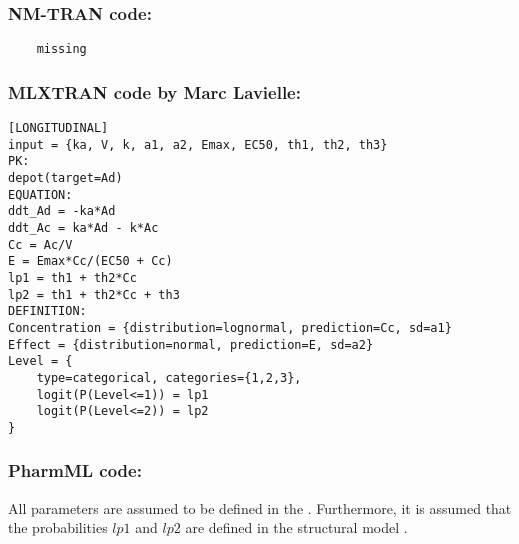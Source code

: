 \subsubsection{NM-TRAN code:}

\myStartLine

\lstset{language=NONMEMdataSet}
\begin{lstlisting}
	missing
\end{lstlisting}

\myEndLine

\subsubsection{MLXTRAN code by Marc Lavielle:}

\myStartLine

\lstset{language=MLXTRANcode}
\begin{lstlisting}
[LONGITUDINAL]
input = {ka, V, k, a1, a2, Emax, EC50, th1, th2, th3}
PK:
depot(target=Ad)
EQUATION:
ddt_Ad = -ka*Ad
ddt_Ac = ka*Ad - k*Ac
Cc = Ac/V
E = Emax*Cc/(EC50 + Cc)
lp1 = th1 + th2*Cc
lp2 = th1 + th2*Cc + th3
DEFINITION:
Concentration = {distribution=lognormal, prediction=Cc, sd=a1}
Effect = {distribution=normal, prediction=E, sd=a2}
Level = {
	type=categorical, categories={1,2,3},
	logit(P(Level<=1)) = lp1
	logit(P(Level<=2)) = lp2
}
\end{lstlisting}

\myEndLine

\subsubsection{PharmML code:}
All parameters are assumed to be defined in the  .
Furthermore, it is assumed that the probabilities $lp1$ and $lp2$ are defined
in the structural model .

